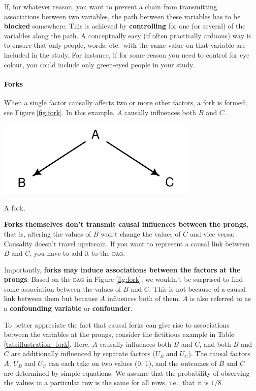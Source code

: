 \documentclass[a4paper]{tufte-book}\usepackage[]{graphicx}\usepackage[]{xcolor}
\newcommand{\term}[1]{\textbf{#1}}
\begin{document}
If, for whatever reason,
you want to prevent a chain from transmitting associations between two variables,
the path between these variables has to be \term{blocked} somewhere.
This is achieved by \term{controlling} for one (or several) of the variables
along the path.
A conceptually easy (if often practically arduous) way is to ensure that
only people, words, etc.\ with the same value on that variable are included in the
study.
For instance, if for some reason you need to control for eye colour, you could include
only green-eyed people in your study.

\paragraph{Forks}
When a single factor causally affects two or more other factors,
a fork is formed; see Figure \ref{fig:fork}. In this example,
$A$ causally influences both $B$ and $C$.

\begin{marginfigure}
\includegraphics[width=\textwidth]{figure/fork}
\caption{A fork.}
\label{fig:fork}
\end{marginfigure}

\textbf{Forks themselves don't transmit causal influences between the prongs},
that is, altering the values of $B$ won't change the values of $C$ and vice
versa: Causality doesn't travel upstream. If you want to represent a causal
link between $B$ and $C$, you have to add it to the \textsc{dag}.

Importantly, \textbf{forks may induce associations between the factors at the prongs}:
Based on the \textsc{dag} in Figure \ref{fig:fork}, we wouldn't be surprised to find
some association between
the values of $B$ and $C$. This is not because of a causal link between them
but because $A$ influences both of them. $A$ is also referred to as a \term{confounding variable}
or \term{confounder}.

To better appreciate the fact that causal forks can give rise to
associations between the variables at the prongs, consider the fictitious
example in Table \ref{tab:illustration_fork}. Here, $A$ causally influences
both $B$ and $C$,
and both $B$ and $C$ are additionally influenced by
separate factors ($U_B$ and $U_C$). The causal factors $A$, $U_B$ and $U_C$ can
each take on two values (0, 1), and the outcomes of $B$ and $C$ are
determined by simple equations.
We assume that the probability of observing the values in a particular row
is the same for all rows, i.e., that it is $1/8$.
\end{document}
